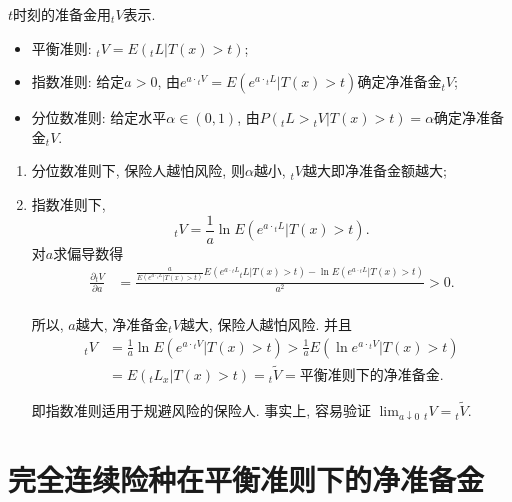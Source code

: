 \documentclass[lang=cn,10pt]{elegantbook}
\begin{document}
\begin{proposition}
    $t$时刻的准备金用${}_tV$表示.
\begin{itemize}
    \item 平衡准则: ${}_tV=E({}_tL|T(x)>t)$;
    \item 指数准则: 给定$a>0$, 由$e^{a\cdot{}_tV}=E(e^{a\cdot{}_tL}|T(x)>t)$确定净准备金${}_tV$;
    \item 分位数准则: 给定水平$\alpha\in(0,1)$, 由$P({}_tL>{}_tV|T(x)>t)=\alpha$确定净准备金${}_tV.$
\end{itemize}
\end{proposition}

\begin{remark}
    \begin{enumerate}
        \item 分位数准则下, 保险人越怕风险, 则$\alpha$越小, ${}_tV$越大即净准备金额越大;
        \item 指数准则下, $${}_tV=\frac{1}{a}\ln E(e^{a\cdot{}_tL}|T(x)>t).$$
        对$a$求偏导数得
        \begin{align*}
            \frac{\partial {}_tV}{\partial a} &= \frac{\frac{a}{E(e^{a\cdot {}_tL}|T( x ) >t )}E( e^{a\cdot {}_tL}{}_tL|T( x ) >t )-\ln E( e^{a\cdot {}_tL}|T( x ) >t )}{a^2} >0. \\
        \end{align*}
        
        所以, $a$越大, 净准备金${}_tV$越大, 保险人越怕风险. 并且
        \begin{align*}
           {}_tV&=\frac{1}{a}\ln E(e^{a\cdot{}_tV}|T(x)>t)>\frac{1}{a}E(\ln e^{ a\cdot {}_tV}|T(x)>t)\\
           &=E(_tL_x|T(x)>t)={}_t\widetilde{V}=\text{平衡准则下的净准备金.}
        \end{align*}
        
        即指数准则适用于规避风险的保险人. 事实上, 容易验证 $\lim_{a\downarrow 0}{}_tV={}_t\widetilde{V}.$
    \end{enumerate}
\end{remark}

\section{完全连续险种在平衡准则下的净准备金}
\end{document}
